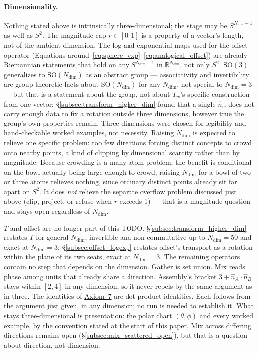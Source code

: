 \documentclass[12pt, a4paper]{article}
\begin{document}
\paragraph{Dimensionality.}
\label{subsec:dimensionality_open}
Nothing stated
above is intrinsically three-dimensional; the stage may be
$S^{N_{\mathrm{dim}}-1}$ as well as $S^2$. The magnitude cap
$r\in[0,1]$ is a property of a vector's length, not of the ambient
dimension. The log and exponential maps used for the offset operator
(Equations around~\eqref{eq:sphere_exp}--\eqref{eq:analogical_offset})
are already Riemannian statements that hold on any $S^{N_{\mathrm{dim}}-1}$ in
$\mathbb{R}^{N_{\mathrm{dim}}}$, not only $S^2$. $\mathrm{SO}(3)$ generalizes to
$\mathrm{SO}(N_{\mathrm{dim}})$ as an abstract group --- associativity and
invertibility are group-theoretic facts about $\mathrm{SO}(N_{\mathrm{dim}})$ for
any $N_{\mathrm{dim}}$, not special to $N_{\mathrm{dim}}=3$ --- but that is a statement about the
group, not about $T_w$'s specific construction from one vector:
\S\ref{subsec:transform_higher_dim} found that a single $\hat n_w$
does not carry enough data to fix a rotation outside three
dimensions, however true the group's own properties remain. Three
dimensions were chosen for legibility and hand-checkable worked
examples, not necessity. Raising $N_{\mathrm{dim}}$ is expected to relieve one
specific problem: too few directions forcing distinct concepts to
crowd onto nearby points, a kind of clipping by dimensional scarcity
rather than by magnitude. Because crowding is a many-atom problem, the
benefit is conditional on the bowl actually being large enough to
crowd; raising $N_{\mathrm{dim}}$ for a bowl of two or three atoms relieves nothing,
since ordinary distinct points already sit far apart on $S^2$. It does
\emph{not} relieve the separate
overflow problem discussed just above (clip, project, or refuse when
$r$ exceeds 1) --- that is a magnitude question and stays open
regardless of $N_{\mathrm{dim}}$.

$T$ and offset are no longer part of this TODO.
\S\ref{subsec:transform_higher_dim} restates $T$ for general
$N_{\mathrm{dim}}$, invertible and non-commutative up to
$N_{\mathrm{dim}}=50$ and exact at $N_{\mathrm{dim}}=3$;
\S\ref{subsec:offset_logexp} restates offset's transport as a
rotation within the plane of its two seats, exact at
$N_{\mathrm{dim}}=3$. The remaining operators contain no step that
depends on the dimension. Gather is set union. Mix reads phase among
units that already share a direction. Assembly's bracket
$3+\hat n_A\cdot\hat n_B$ stays within $[2,4]$ in any dimension, so it
never repels by the same argument as in three. The identities of
\hyperref[subsec:axiom_v1_metrics]{Axiom~7} are dot-product
identities. Each follows from the argument just given, in any
dimension; no run is needed to establish it. What stays three-dimensional is presentation: the
polar chart $(\theta,\phi)$ and every worked example, by the
convention stated at the start of this paper. Mix across differing
directions remains open (\S\ref{subsec:mix_scattered_open}), but
that is a question about direction, not dimension.
\end{document}
